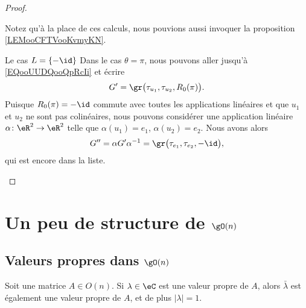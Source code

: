 \begin{proof}
\begin{subproof}
		Notez qu'à la place de ces calculs, nous pouvions aussi invoquer la proposition \ref{LEMooCFTVooKvmyKN}.

		\item[Le cas \( L=\{ -\id \}\)]
		Dans le cas \( \theta=\pi\), nous pouvons aller jusqu'à \eqref{EQooUUDQooQpRcIi} et écrire
		\begin{equation}
			G'=\gr\big( \tau_{u_1}, \tau_{u_2}, R_0(\pi) \big).
		\end{equation}
		Puisque \( R_0(\pi)=-\id\) commute avec toutes les applications linéaires et que \( u_1\) et \( u_2\) ne sont pas colinéaires, nous pouvons considérer une application linéaire \( \alpha\colon \eR^2\to \eR^2\) telle que \( \alpha(u_1)=e_1\), \( \alpha(u_2)=e_2\). Nous avons alors
		\begin{equation}
			G''=\alpha G'\alpha^{-1}=\gr\big( \tau_{e_1}, \tau_{e_2},-\id \big),
		\end{equation}
		qui est encore dans la liste.
	\end{subproof}
\end{proof}

\section{Un peu de structure de \texorpdfstring{\( \gO(n)\)}{O(n)}}

\subsection{Valeurs propres dans \( \gO(n)\)}

\begin{proposition}      \label{PROPooVEJGooWnqtMm}
	Soit une matrice \( A\in O(n)\). Si \( \lambda\in \eC\) est une valeur propre de \( A\), alors \( \bar\lambda\) est également une valeur propre de \( A\), et de plus \( | \lambda |=1\).
\end{proposition}

